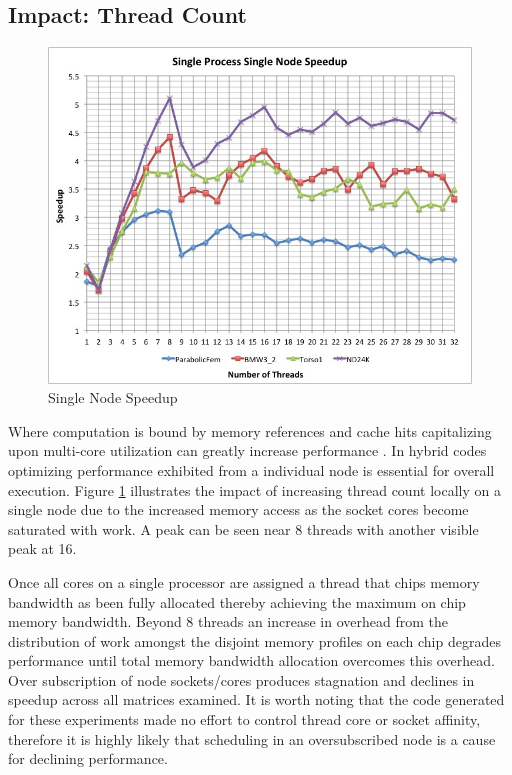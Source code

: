 \subsection{Impact: Thread Count}\label{sec:dspmv-threadscaling}

\begin{figure}[H]
	\begin{centering}
		\includegraphics[scale=0.25]{figures/single_node_speedup.jpg}
		\caption{Single Node Speedup}
		\label{fig:spmv-page-singlenode}
\end{centering}
\end{figure}

Where computation is bound by memory references and cache hits capitalizing upon multi-core utilization can greatly increase performance \cite{blelloch2008provably}. In hybrid codes optimizing performance exhibited from a individual node is essential for overall execution. Figure \ref{fig:spmv-page-singlenode} illustrates the impact of increasing thread count locally on a single node due to the increased memory access as the socket cores become saturated with work. A peak can be seen near 8 threads with another visible peak at 16. 

Once all cores on a single processor are assigned a thread that chips memory bandwidth as been fully allocated thereby achieving the maximum on chip memory bandwidth. Beyond 8 threads an increase in overhead from the distribution of work amongst the disjoint memory profiles on each chip degrades performance until total memory bandwidth allocation overcomes this overhead. Over subscription of node sockets/cores produces stagnation and declines in speedup across all matrices examined. It is worth noting that the code generated for these experiments made no effort to control thread core or socket affinity, therefore it is highly likely that scheduling in an oversubscribed node is a cause for declining performance. 
